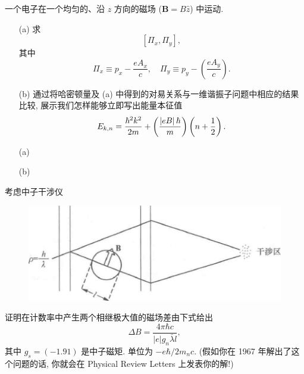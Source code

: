 \documentclass{assignment}
\begin{document}
\begin{prob}[课本习题 2.39]
    一个电子在一个均匀的、沿 $z$ 方向的磁场 ($\bm{B}=B\hat{z}$) 中运动.
    \begin{itemize}
        \item[(a)] 求
        \[
            [\Pi_x,\Pi_y],
        \]
        其中
        \[
            \Pi_x\equiv p_x-\frac{eA_x}{c},\quad\Pi_y\equiv p_y-\left(\frac{eA_y}{c}\right).
        \]
        \item[(b)] 通过将哈密顿量及 (a) 中得到的对易关系与一维谐振子问题中相应的结果比较, 展示我们怎样能够立即写出能量本征值
        \[
            E_{k,n}=\frac{\hbar^2k^2}{2m}+\left(\frac{\left\lvert eB\right\rvert\hbar}{m}\right)\left(n+\frac{1}{2}\right).
        \]
    \end{itemize}
\end{prob}
\begin{sol}
    \begin{itemize}
        \item[(a)] 
        \item[(b)] 
    \end{itemize}
\end{sol}

\begin{prob}[课本习题 2.40]
    考虑中子干涉仪
    \begin{figure}[H]
        \centering
        \includegraphics[width=.5\columnwidth]{4-9.png}
    \end{figure}
    证明在计数率中产生两个相继极大值的磁场差由下式给出
    \[
        \Delta B=\frac{4\pi\hbar c}{|e|g_n\bar{\lambda}l},
    \]
    其中 $g_s=(-1.91)$ 是中子磁矩. 单位为 $-e\hbar/2m_nc$. (假如你在 1967 年解出了这个问题的话, 你就会在 Physical Review Letters 上发表你的解!)
\end{prob}
\begin{pf}
    
\end{pf}
\end{document}

